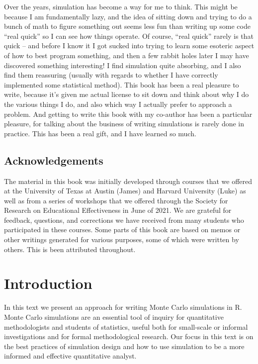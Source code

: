 \documentclass[
]{book}
\begin{document}
Over the years, simulation has become a way for me to think.
This might be because I am fundamentally lazy, and the idea of sitting down and trying to do a bunch of math to figure something out seems less fun than writing up some code ``real quick'' so I can see how things operate. Of course, ``real quick'' rarely is that quick -- and before I know it I got sucked into trying to learn some esoteric aspect of how to best program something, and then a few rabbit holes later I may have discovered something interesting! I find simulation quite absorbing, and I also find them reassuring (usually with regards to whether I have correctly implemented some statistical method). This book has been a real pleasure to write, because it's given me actual license to sit down and think about why I do the various things I do, and also which way I actually prefer to approach a problem. And getting to write this book with my co-author has been a particular pleasure, for talking about the business of writing simulations is rarely done in practice. This has been a real gift, and I have learned so much.

\hypertarget{acknowledgements}{%
\section*{Acknowledgements}\label{acknowledgements}}

The material in this book was initially developed through courses that we offered at the University of Texas at Austin (James) and Harvard University (Luke) as well as from a series of workshops that we offered through the Society for Research on Educational Effectiveness in June of 2021. We are grateful for feedback, questions, and corrections we have received from many students who participated in these courses. Some parts of this book are based on memos or other writings generated for various purposes, some of which were written by others. This is been attributed throughout.

\hypertarget{introduction}{%
\chapter{Introduction}\label{introduction}}

In this text we present an approach for writing Monte Carlo simulations in R.
Monte Carlo simulations are an essential tool of inquiry for quantitative methodologists and students of statistics, useful both for small-scale or informal investigations and for formal methodological research.
Our focus in this text is on the best practices of simulation design and how to use simulation to be a more informed and effective quantitative analyst.
\end{document}
